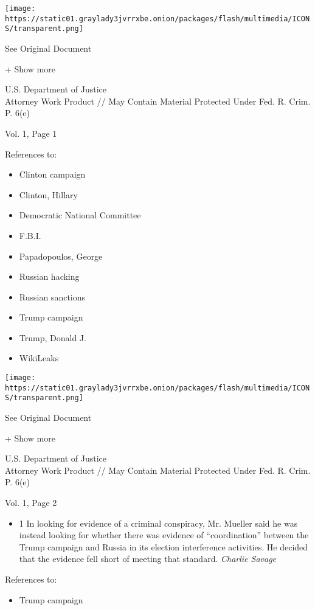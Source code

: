 \texttt{[image: https://static01.graylady3jvrrxbe.onion/packages/flash/multimedia/ICONS/transparent.png]}

See Original Document

+ Show more

U.S. Department of Justice\\
Attorney Work Product // May Contain Material Protected Under Fed. R.
Crim. P. 6(e)

Vol. 1, Page 1

References to:

\begin{itemize}
\tightlist
\item
  Clinton campaign
\item
  Clinton, Hillary
\item
  Democratic National Committee
\item
  F.B.I.
\item
  Papadopoulos, George
\item
  Russian hacking
\item
  Russian sanctions
\item
  Trump campaign
\item
  Trump, Donald J.
\item
  WikiLeaks
\end{itemize}

\protect\hyperlink{}{}

\texttt{[image: https://static01.graylady3jvrrxbe.onion/packages/flash/multimedia/ICONS/transparent.png]}

See Original Document

+ Show more

U.S. Department of Justice\\
Attorney Work Product // May Contain Material Protected Under Fed. R.
Crim. P. 6(e)

Vol. 1, Page 2

\begin{itemize}
\tightlist
\item
  1 In looking for evidence of a criminal conspiracy, Mr. Mueller said
  he was instead looking for whether there was evidence of
  ``coordination'' between the Trump campaign and Russia in its election
  interference activities. He decided that the evidence fell short of
  meeting that standard. \emph{Charlie Savage}
\end{itemize}

References to:

\begin{itemize}
\tightlist
\item
  Trump campaign
\end{itemize}


